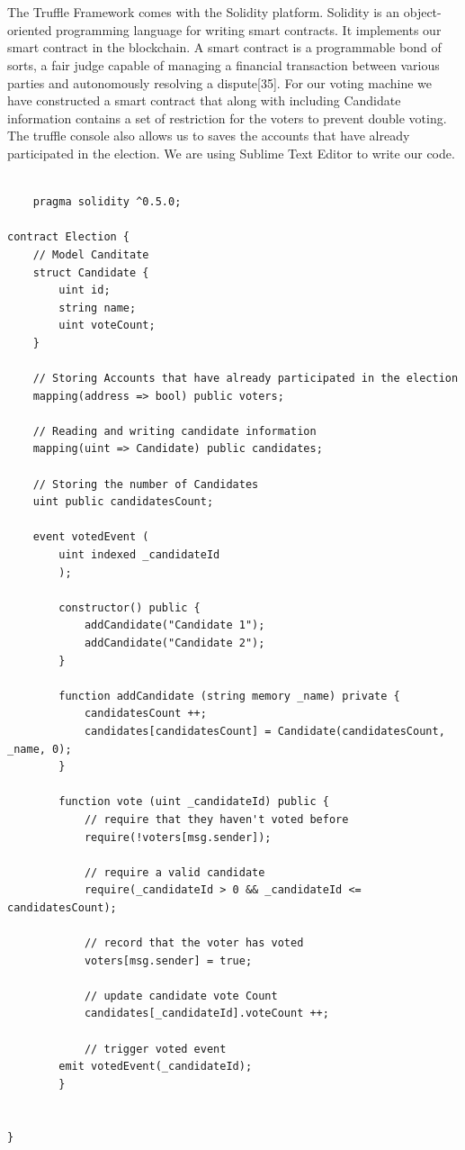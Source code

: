 \documentclass{article}
\begin{document}
\\
\\
The Truffle Framework comes with the Solidity platform. Solidity is an object-oriented programming language for writing smart contracts. It implements our smart contract in the blockchain. A smart contract is a programmable bond of sorts, a fair judge capable of managing a financial transaction between various parties and autonomously resolving a dispute[35]. For our voting machine we have constructed a smart contract that along with including Candidate information contains a set of restriction for the voters to prevent double voting. The truffle console also allows us to saves the accounts that have already participated in the election. We are using Sublime Text Editor to write our code.
\\
\\
\begin{verbatim}
    pragma solidity ^0.5.0;

contract Election {
    // Model Canditate
    struct Candidate {
        uint id;
        string name;
        uint voteCount;
    }

    // Storing Accounts that have already participated in the election
    mapping(address => bool) public voters;

    // Reading and writing candidate information
    mapping(uint => Candidate) public candidates;

    // Storing the number of Candidates
    uint public candidatesCount;

    event votedEvent (
        uint indexed _candidateId
        );

        constructor() public {
            addCandidate("Candidate 1");
            addCandidate("Candidate 2");
        }

        function addCandidate (string memory _name) private {
            candidatesCount ++;
            candidates[candidatesCount] = Candidate(candidatesCount, _name, 0);
        }

        function vote (uint _candidateId) public {
            // require that they haven't voted before
            require(!voters[msg.sender]);

            // require a valid candidate
            require(_candidateId > 0 && _candidateId <= candidatesCount);

            // record that the voter has voted
            voters[msg.sender] = true;

            // update candidate vote Count
            candidates[_candidateId].voteCount ++;

            // trigger voted event
        emit votedEvent(_candidateId);
        }


}              
\end{verbatim}
\end{document}
